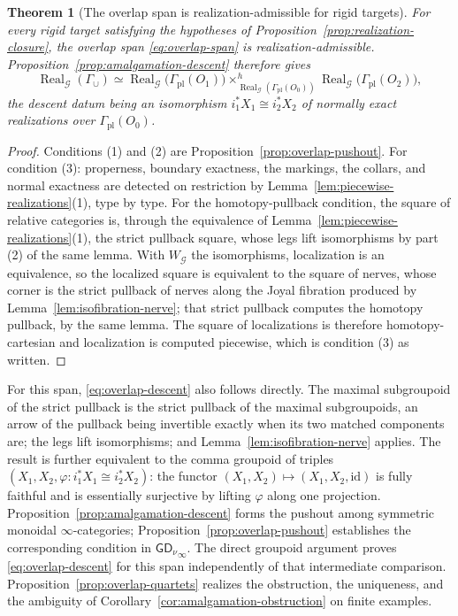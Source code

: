 \documentclass[11pt,letterpaper,twoside]{article}
\theoremstyle{plain}
\newtheorem{theorem}{Theorem}[section]
\theoremstyle{definition}
\theoremstyle{remark}
\newcommand{\LGrm}{\mathsf{GD}_{\nu}}
\newcommand{\Real}{\operatorname{Real}}
\begin{document}
\begin{theorem}[The overlap span is realization-admissible for rigid targets]\label{thm:overlap-admissible}
For every rigid target satisfying the hypotheses of Proposition~\ref{prop:realization-closure}, the overlap span \eqref{eq:overlap-span} is realization-admissible.  Proposition~\ref{prop:amalgamation-descent} therefore gives
\begin{equation}\label{eq:overlap-descent}
 \Real_{\mathcal G}(\Gamma_\cup)
 \simeq
 \Real_{\mathcal G}\bigl(\Gamma_{\mathrm{pl}}(O_1)\bigr)
 \times^{h}_{\Real_{\mathcal G}(\Gamma_{\mathrm{pl}}(O_0))}
 \Real_{\mathcal G}\bigl(\Gamma_{\mathrm{pl}}(O_2)\bigr),
\end{equation}
the descent datum being an isomorphism \(i_1^*X_1\cong i_2^*X_2\) of normally exact realizations over \(\Gamma_{\mathrm{pl}}(O_0)\).
\end{theorem}

\begin{proof}
Conditions (1) and (2) are Proposition~\ref{prop:overlap-pushout}.  For condition (3): properness, boundary exactness, the markings, the collars, and normal exactness are detected on restriction by Lemma~\ref{lem:piecewise-realizations}(1), type by type.  For the homotopy-pullback condition, the square of relative categories is, through the equivalence of Lemma~\ref{lem:piecewise-realizations}(1), the strict pullback square, whose legs lift isomorphisms by part (2) of the same lemma.  With \(W_{\mathcal G}\) the isomorphisms, localization is an equivalence, so the localized square is equivalent to the square of nerves, whose corner is the strict pullback of nerves along the Joyal fibration produced by Lemma~\ref{lem:isofibration-nerve}; that strict pullback computes the homotopy pullback, by the same lemma.  The square of localizations is therefore homotopy-cartesian and localization is computed piecewise, which is condition (3) as written.
\end{proof}

For this span, \eqref{eq:overlap-descent} also follows directly.  The maximal subgroupoid of the strict pullback is the strict pullback of the maximal subgroupoids, an arrow of the pullback being invertible exactly when its two matched components are; the legs lift isomorphisms; and Lemma~\ref{lem:isofibration-nerve} applies.  The result is further equivalent to the comma groupoid of triples \((X_1,X_2,\varphi:i_1^*X_1\cong i_2^*X_2)\): the functor \((X_1,X_2)\mapsto(X_1,X_2,\mathrm{id})\) is fully faithful and is essentially surjective by lifting \(\varphi\) along one projection.  Proposition~\ref{prop:amalgamation-descent} forms the pushout among symmetric monoidal \(\infty\)-categories; Proposition~\ref{prop:overlap-pushout} establishes the corresponding condition in \({\LGrm}_\infty\).  The direct groupoid argument proves \eqref{eq:overlap-descent} for this span independently of that intermediate comparison.  Proposition~\ref{prop:overlap-quartets} realizes the obstruction, the uniqueness, and the ambiguity of Corollary~\ref{cor:amalgamation-obstruction} on finite examples.
\end{document}
